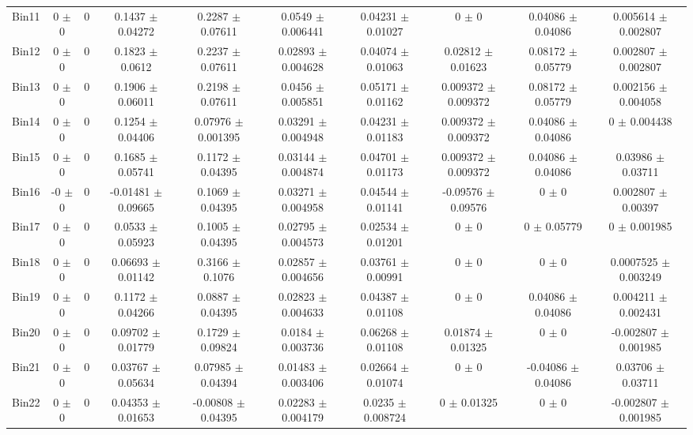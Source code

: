 \begin{tabular}{@{\extracolsep{4pt}}lccccccccc@{}}
     Bin11 & 0 $\pm$ 0 & 0 & 0.1437 $\pm$ 0.04272 & 0.2287 $\pm$ 0.07611 & 0.0549 $\pm$ 0.006441 & 0.04231 $\pm$ 0.01027 & 0 $\pm$ 0 & 0.04086 $\pm$ 0.04086 & 0.005614 $\pm$ 0.002807 \\ 
     Bin12 & 0 $\pm$ 0 & 0 & 0.1823 $\pm$ 0.0612 & 0.2237 $\pm$ 0.07611 & 0.02893 $\pm$ 0.004628 & 0.04074 $\pm$ 0.01063 & 0.02812 $\pm$ 0.01623 & 0.08172 $\pm$ 0.05779 & 0.002807 $\pm$ 0.002807 \\ 
     Bin13 & 0 $\pm$ 0 & 0 & 0.1906 $\pm$ 0.06011 & 0.2198 $\pm$ 0.07611 & 0.0456 $\pm$ 0.005851 & 0.05171 $\pm$ 0.01162 & 0.009372 $\pm$ 0.009372 & 0.08172 $\pm$ 0.05779 & 0.002156 $\pm$ 0.004058 \\ 
     Bin14 & 0 $\pm$ 0 & 0 & 0.1254 $\pm$ 0.04406 & 0.07976 $\pm$ 0.001395 & 0.03291 $\pm$ 0.004948 & 0.04231 $\pm$ 0.01183 & 0.009372 $\pm$ 0.009372 & 0.04086 $\pm$ 0.04086 & 0 $\pm$ 0.004438 \\ 
     Bin15 & 0 $\pm$ 0 & 0 & 0.1685 $\pm$ 0.05741 & 0.1172 $\pm$ 0.04395 & 0.03144 $\pm$ 0.004874 & 0.04701 $\pm$ 0.01173 & 0.009372 $\pm$ 0.009372 & 0.04086 $\pm$ 0.04086 & 0.03986 $\pm$ 0.03711 \\ 
     Bin16 & -0 $\pm$ 0 & 0 & -0.01481 $\pm$ 0.09665 & 0.1069 $\pm$ 0.04395 & 0.03271 $\pm$ 0.004958 & 0.04544 $\pm$ 0.01141 & -0.09576 $\pm$ 0.09576 & 0 $\pm$ 0 & 0.002807 $\pm$ 0.00397 \\ 
     Bin17 & 0 $\pm$ 0 & 0 & 0.0533 $\pm$ 0.05923 & 0.1005 $\pm$ 0.04395 & 0.02795 $\pm$ 0.004573 & 0.02534 $\pm$ 0.01201 & 0 $\pm$ 0 & 0 $\pm$ 0.05779 & 0 $\pm$ 0.001985 \\ 
     Bin18 & 0 $\pm$ 0 & 0 & 0.06693 $\pm$ 0.01142 & 0.3166 $\pm$ 0.1076 & 0.02857 $\pm$ 0.004656 & 0.03761 $\pm$ 0.00991 & 0 $\pm$ 0 & 0 $\pm$ 0 & 0.0007525 $\pm$ 0.003249 \\ 
     Bin19 & 0 $\pm$ 0 & 0 & 0.1172 $\pm$ 0.04266 & 0.0887 $\pm$ 0.04395 & 0.02823 $\pm$ 0.004633 & 0.04387 $\pm$ 0.01108 & 0 $\pm$ 0 & 0.04086 $\pm$ 0.04086 & 0.004211 $\pm$ 0.002431 \\ 
     Bin20 & 0 $\pm$ 0 & 0 & 0.09702 $\pm$ 0.01779 & 0.1729 $\pm$ 0.09824 & 0.0184 $\pm$ 0.003736 & 0.06268 $\pm$ 0.01108 & 0.01874 $\pm$ 0.01325 & 0 $\pm$ 0 & -0.002807 $\pm$ 0.001985 \\ 
     Bin21 & 0 $\pm$ 0 & 0 & 0.03767 $\pm$ 0.05634 & 0.07985 $\pm$ 0.04394 & 0.01483 $\pm$ 0.003406 & 0.02664 $\pm$ 0.01074 & 0 $\pm$ 0 & -0.04086 $\pm$ 0.04086 & 0.03706 $\pm$ 0.03711 \\ 
     Bin22 & 0 $\pm$ 0 & 0 & 0.04353 $\pm$ 0.01653 & -0.00808 $\pm$ 0.04395 & 0.02283 $\pm$ 0.004179 & 0.0235 $\pm$ 0.008724 & 0 $\pm$ 0.01325 & 0 $\pm$ 0 & -0.002807 $\pm$ 0.001985 \\ 

\end{tabular}
